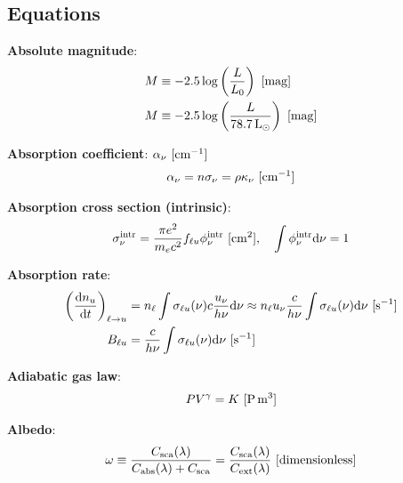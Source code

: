 \documentclass[a4paper,10pt]{article}
\begin{document}

\newpage
\subsection{Equations}

{\noindent}\textbf{Absolute magnitude}:
\begin{align*}
    M &\equiv -2.5\log\left(\frac{L}{L_0}\right) ~ [{\rm mag}] \\
    M &\equiv -2.5\log\left(\frac{L}{78.7\,{\rm L_\odot}}\right) ~ [{\rm mag}]
\end{align*}

{\noindent}\textbf{Absorption coefficient}: $\alpha_\nu ~ [{\rm cm^{-1}}]$
\begin{align*}
    \alpha_\nu = n\sigma_\nu = \rho\kappa_\nu ~ [{\rm cm^{-1}}]
\end{align*}

{\noindent}\textbf{Absorption cross section (intrinsic)}:
\begin{align*}
    \sigma_\nu^{\rm intr} = \frac{\pi e^2}{m_ec^2}f_{\ell u} \phi_\nu^{\rm intr} ~ [{\rm cm^2}], ~~~ \int\phi_\nu^{\rm intr}{\rm d}\nu =1
\end{align*}

{\noindent}\textbf{Absorption rate}:
\begin{align*}
    \left(\frac{{\rm d}n_u}{{\rm d}t}\right)_{\ell\rightarrow u} &= n_\ell \int \sigma_{\ell u}(\nu)c \frac{u_\nu}{h\nu}{\rm d}\nu \approx n_\ell u_\nu \frac{c}{h\nu} \int \sigma_{\ell u}(\nu){\rm d}\nu ~ [{\rm s^{-1}}] \\
     B_{\ell u} &= \frac{c}{h\nu} \int \sigma_{\ell u}(\nu){\rm d}\nu ~ [{\rm s^{-1}}]
\end{align*}

{\noindent}\textbf{Adiabatic gas law}:
\begin{align*}
    PV^\gamma = K ~ [{\rm P\,m^3}]
\end{align*}

{\noindent}\textbf{Albedo}:
\begin{align*}
    \omega \equiv \frac{C_{\rm sca}(\lambda)}{C_{\rm abs}(\lambda)+C_{\rm sca}} = \frac{C_{\rm sca}(\lambda)}{C_{\rm ext}(\lambda)} ~ [{\rm dimensionless}]
\end{align*}
\end{document}

